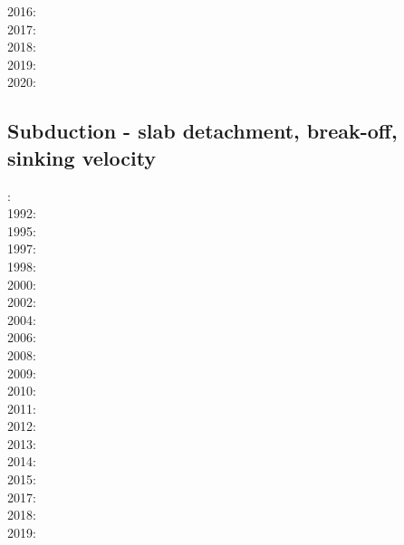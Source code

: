 {2016: \cite{tomy16}\cite{gukt16}\cite{robn16}\cite{mavm16}\cite{magc16}\cite{marl16}\cite{mesj16}
      \cite{jada16}\cite{jada16b}\cite{liku16}\cite{chss16}\\
2017: \cite{kicf17}\cite{sche17}\cite{pest17}\cite{vomc17}\cite{majf17}\cite{yabr17}\cite{shwl17}
      \cite{hobe17}\\
2018: \cite{yamz18}\cite{crli18}\cite{spcv18}\cite{chss18}\cite{yagz18}\cite{mazh18}\cite{pukp18}
      \cite{masg18}\cite{biar18}\\
2019: \cite{magn19}\cite{mavb19}\cite{scvm19}\cite{cakc19}\cite{samo19}\cite{sihf19}\cite{meag19}
      \cite{vaws19}\cite{bokg19}\cite{vawg19}\cite{cibi19}\cite{pust19}\\
2020: \cite{algg20}\cite{braf20}\cite{vamg20}\cite{dawl20}\cite{meag20}\cite{bedh20}\cite{heyg20}
      \cite{kicd20}\cite{mugu20}\cite{gatt20}\cite{pust20}
}

\subsection{Subduction - slab detachment, break-off, sinking velocity}


{\scriptsize
{}: \cite{futo85}\\
1992: \cite{wosp92}\\
1995: \cite{yowo95}\cite{voda95}\cite{davo95}\\
1997: \cite{wowo97}\\
1998: \cite{desw98}\cite{caws98}\\
2000: \cite{wosp00}\\
2002: \cite{bugw02}\\
2004: \cite{geym04}\\
2006: \cite{fabm06}\\
2008: \cite{zlfd08}\\
2009: \cite{anbi09}\cite{bubi09}\cite{vasv09}\\
2010: \cite{bubi10}\cite{bagc10}\cite{hagr10}\\
2011: \cite{dugm11}\cite{vaal11}\cite{schm11}\\
2012: \cite{dugk12}\cite{dusg12}\\
2013: \cite{care13}\cite{mafv13}\cite{ghbu13}\cite{duge13}\cite{lixg13}\\
2014: \cite{dugs14}\cite{besr14}\cite{vosd14}\cite{butm14}\\
2015: \cite{vosc15}\cite{fohk15}\\
2017: \cite{frbm17}\cite{maav17}\\
2018: \cite{garm18}\cite{bezb18}\\
2019: \cite{beml19}\cite{fegb19}
}

